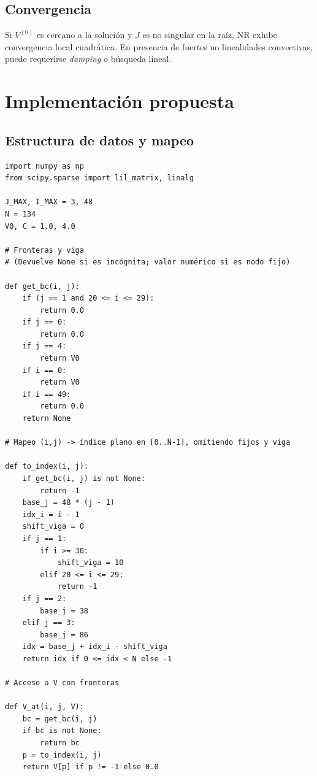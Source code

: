 \documentclass[12pt,a4paper]{report}
\theoremstyle{definition}
\begin{document}
\section{Convergencia}
Si \(V^{(0)}\) es cercano a la solución y \(J\) es no singular en la raíz, NR exhibe convergencia local cuadrática. En presencia de fuertes no linealidades convectivas, puede requerirse \emph{damping} o búsqueda lineal.

\chapter{Implementación propuesta}
\section{Estructura de datos y mapeo}
\begin{lstlisting}[style=mypython]
import numpy as np
from scipy.sparse import lil_matrix, linalg

J_MAX, I_MAX = 3, 48
N = 134
V0, C = 1.0, 4.0

# Fronteras y viga
# (Devuelve None si es incógnita; valor numérico si es nodo fijo)

def get_bc(i, j):
    if (j == 1 and 20 <= i <= 29):
        return 0.0
    if j == 0:
        return 0.0
    if j == 4:
        return V0
    if i == 0:
        return V0
    if i == 49:
        return 0.0
    return None

# Mapeo (i,j) -> índice plano en [0..N-1], omitiendo fijos y viga

def to_index(i, j):
    if get_bc(i, j) is not None:
        return -1
    base_j = 48 * (j - 1)
    idx_i = i - 1
    shift_viga = 0
    if j == 1:
        if i >= 30:
            shift_viga = 10
        elif 20 <= i <= 29:
            return -1
    if j == 2:
        base_j = 38
    elif j == 3:
        base_j = 86
    idx = base_j + idx_i - shift_viga
    return idx if 0 <= idx < N else -1

# Acceso a V con fronteras

def V_at(i, j, V):
    bc = get_bc(i, j)
    if bc is not None:
        return bc
    p = to_index(i, j)
    return V[p] if p != -1 else 0.0
\end{lstlisting}
\end{document}
